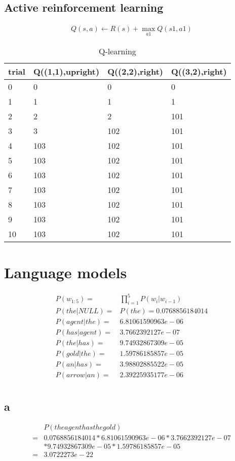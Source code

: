 \documentclass[12pt]{article}
\begin{document}
\subsection{Active reinforcement learning}
\begin{align*}
  Q(s,a) \gets R(s) + \max_{a1} Q(s1,a1)
\end{align*}
\begin{table}[htb] \centering
  \begin{tabularx}{\textwidth}{|X|X|X|X|} \hline
    trial & Q((1,1),upright) & Q((2,2),right) & Q((3,2),right) \\ \hline
    0 & 0 & 0 & 0 \\ \hline
    1 & 1 & 1 & 1 \\ \hline
    2 & 2 & 2 & 101 \\ \hline
    3 & 3 & 102 & 101 \\ \hline
    4 & 103 & 102 & 101 \\ \hline
    5 & 103 & 102 & 101 \\ \hline
    6 & 103 & 102 & 101 \\ \hline
    7 & 103 & 102 & 101 \\ \hline
    8 & 103 & 102 & 101 \\ \hline
    9 & 103 & 102 & 101 \\ \hline
    10 & 103 & 102 & 101 \\ \hline
  \end{tabularx}
  \caption{Q-learning}
  \label{tab:q}
\end{table}

\section{Language models}
\begin{align*}
  P(w_{1:5}) =& \prod_{i=1}^5 P(w_i|w_{i-1})\\
  P(the|NULL) =& P(the) = 0.0768856184014\\
  P(agent|the) =& 6.81061590963e-06\\
  P(has|agent) =& 3.7662392127e-07\\
  P(the|has) =& 9.74932867309e-05\\
  P(gold|the) =& 1.59786185857e-05\\
  P(an|has) =& 3.98802885522e-05\\
  P(arrow|an) =& 2.39225935177e-06\\
\end{align*}
\subsection{a}
\begin{align*}
  &P(the agent has the gold)\\
  =& 0.0768856184014*6.81061590963e-06*3.7662392127e-07\\
  &*9.74932867309e-05*1.59786185857e-05\\
  =& 3.0722273e-22\\
\end{align*}
\end{document}
